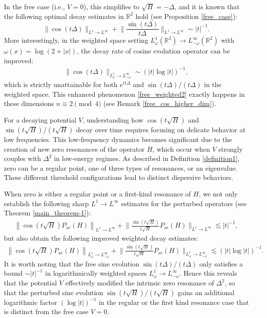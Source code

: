 \documentclass[reqno]{amsart}
\newcommand\R{\mathbb{R}}
\numberwithin{equation}{section}
\begin{document}
In the free case (i.e., $V=0$), this  simplifies to $\sqrt{H} = -\Delta$, and
it is known that the following optimal decay estimates  in $\mathbb{R}^2$ hold (see Proposition \ref{free_case}):
   \[
\|\cos(t\Delta)\|_{L^1\to L^\infty} + \Big\|\frac{\sin(t\Delta)}{t\Delta}\Big\|_{L^1\to L^\infty} \sim {|t|}^{-1}.  
    \]
More interestingly, in the weighted space setting $L^1_\omega (\R^2)\to L^{\infty}_{-\omega}(\R^2)$ with $\omega(x) = \log(2+|x|)$, the decay rate of cosine evolution operator can be improved: 
 \begin{align} \label{free_weighted2} \|\cos(t\Delta)\|_{L^1_\omega\to L^\infty_{-\omega}} \sim ({|t|\log |t|})^{-1},       \end{align} 
which is strictly unattainable for both $e^{it\Delta}$ and $\sin(t\Delta)/(t\Delta)$ in the  weighted space. This enhanced phenomenon \eqref{free_weighted2} exactly happens in these dimensions $n \equiv 2 \pmod{4}$ (see Remark \ref{free_cos_higher_dim}). 

For a decaying potential $V$, understanding how $\cos(t\sqrt{H})$ and $\sin(t\sqrt{H})/(t\sqrt{H})$ decay over time requires focusing on delicate behavior at low frequencies. This low-frequency dynamics becomes significant due to the creation of new zero resonances of the operator $H$, which occur  when  $V$ strongly couples with $\Delta^2$ in low-energy regimes.
As described in Definition \ref{definition1}, zero can be a regular point, one of three types of resonances, or an eigenvalue. These different threshold configurations lead to distinct dispersive behaviors.






When zero is either a regular point or a first-kind resonance of $H$,  we  not only establish  the following sharp $L^1 \to L^\infty$ estimates for the perturbed  operators (see Theorem \ref{main_theorem-1}):
 \begin{align*}
    \left\|\cos (t \sqrt{H}) P_{\mathrm{ac}}(H)\right\|_{L^1 \to L^{\infty}} +
    \bigg\|\frac{\sin (t \sqrt{H})}{t\sqrt{H}} P_{\mathrm{ac}}(H)\bigg\|_{L^1 \to L^{\infty}} \lesssim {|t|}^{-1},
    \end{align*}
but also obtain the following improved weighted decay estimates:    
 \begin{align}\label{the first and regular weigthed estimate}
    \left\|\cos (t \sqrt{H}) P_{\mathrm{ac}}(H)\right\|_{L_\omega^1 \to L_{-\omega}^{\infty}}+
	\bigg \|\frac{\sin (t \sqrt{H})}{t\sqrt{H}} P_{\mathrm{ac}}(H)\bigg \|_{L^1_\omega \rightarrow L^{\infty}_{-\omega}}\lesssim ({|t|\log |t|})^{-1}.
    \end{align}
It is worth noting that the free sine evolution $\sin(t\Delta)/(t\Delta)$ only satisfies a bound $\sim |t|^{-1}$ in logarithmically weighted spaces $L^1_\omega \to L^\infty_{-\omega}$. Hence this reveals that  the potential $V$  effectively modified the intrinsic zero resonance of $\Delta^2$, so that  the perturbed sine evolution $\sin(t\sqrt{H})/(t\sqrt{H})$ gains an additional logarithmic factor $(\log|t|)^{-1}$ in the regular or the first kind resonance case that is distinct from the free case $V=0$.
\end{document}
